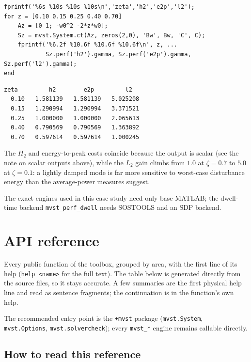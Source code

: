 \documentclass[11pt,oneside]{report}
\newcommand{\code}[1]{\texttt{#1}}
\begin{document}
\begin{lstlisting}[style=matlabstyle]
fprintf('%6s %10s %10s %10s\n','zeta','h2','e2p','l2');
for z = [0.10 0.15 0.25 0.40 0.70]
    Az = [0 1; -w0^2 -2*z*w0];
    Sz = mvst.System.ct(Az, zeros(2,0), 'Bw', Bw, 'C', C);
    fprintf('%6.2f %10.6f %10.6f %10.6f\n', z, ...
            Sz.perf('h2').gamma, Sz.perf('e2p').gamma, Sz.perf('l2').gamma);
end
\end{lstlisting}

\begin{lstlisting}[style=outputstyle]
  zeta         h2        e2p         l2
  0.10   1.581139   1.581139   5.025208
  0.15   1.290994   1.290994   3.371521
  0.25   1.000000   1.000000   2.065613
  0.40   0.790569   0.790569   1.363892
  0.70   0.597614   0.597614   1.000245
\end{lstlisting}

The \(H_2\) and energy-to-peak costs coincide because the output is scalar (see the note on scalar outputs above), while the \(L_2\) gain climbs from \(1.0\) at \(\zeta = 0.7\) to \(5.0\) at
\(\zeta = 0.1\): a lightly damped mode is far more sensitive to worst-case
disturbance energy than the average-power measures suggest.

The exact engines used in this case study need only base MATLAB; the dwell-time
backend \code{mvst\_perf\_dwell} needs SOSTOOLS and an SDP backend.


\hypertarget{chap:13-api-reference}{%
\chapter{API reference}\label{chap:13-api-reference}}

Every public function of the toolbox, grouped by area, with the first line of
its help (\code{help \textless{}name\textgreater{}} for the full text). The table below is generated
directly from the source files, so it stays accurate. A few summaries are the
first physical help line and read as sentence fragments; the continuation is in
the function's own help.

The recommended entry point is the \code{+mvst} package (\code{mvst.System},
\code{mvst.Options}, \code{mvst.solvercheck}); every \code{mvst\_*} engine remains callable
directly.

\hypertarget{how-to-read-this-reference}{%
\section{How to read this reference}\label{how-to-read-this-reference}}
\end{document}
